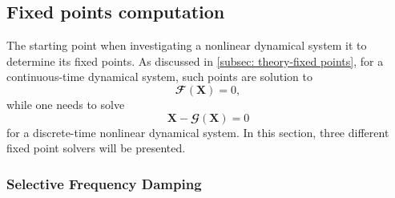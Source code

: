 




  \subsection{Fixed points computation}
  \label{subsec: numerics-fixed points computation}

  The starting point when investigating a nonlinear dynamical system it to determine its fixed points. As discussed in \textsection \ref{subsec: theory-fixed points}, for a continuous-time dynamical system, such points are solution to
  \begin{equation}
    \mathbfcal{F} \left( \mathbf{X} \right) = 0,
    \label{eq: numerics -- continuous-time fixed point}
  \end{equation}
  while one needs to solve
  \begin{equation}
    \mathbf{X} - \mathbfcal{G} \left( \mathbf{X} \right) = 0
    \label{eq: numerics -- discrete-time fixed point}
  \end{equation}
  for a discrete-time nonlinear dynamical system. In this section, three different fixed point solvers will be presented.

    \subsubsection{Selective Frequency Damping}
    \label{subsubsec: numerics -- selective frequency damping}

